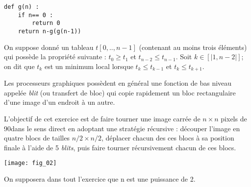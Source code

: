 \begin{lstlisting}
def g(n) :
    if n== 0 : 
        return 0
    return n-g(g(n-1))
\end{lstlisting}


\exer{}
\setcounter{question}{0}

On suppose donné un tableau $t[0,.., n-1]$ (contenant au moins trois éléments) qui possède la propriété suivante : $t_0\geq t_1$ et $t_{n-2}\leq t_{n-1}$. Soit $k\in[|1,n-2|]$; on dit que $t_k$ est un minimum local lorsque $t_k\leq t_{k-1}$ et $t_k\leq t_{k+1}$.



\exer{}
\setcounter{question}{0}

Les processeurs graphiques possèdent en général une fonction de bas niveau appelée \textit{blit} (ou transfert de bloc) qui copie rapidement un bloc rectangulaire d’une image d’un endroit à un autre.

L’objectif de cet exercice est de faire tourner une image carrée de $n\times n$ pixels de 90\textdegree dans le sens direct en
adoptant une stratégie récursive : découper l’image en quatre blocs de tailles $n/2 \times n/2$, déplacer chacun des ces
blocs à sa position finale à l’aide de 5 \textit{blits}, puis faire tourner récursivement chacun de ces blocs.

\begin{center}
\texttt{[image: fig\_02]}
\end{center}

On supposera dans tout l’exercice que n est une puissance de 2.



